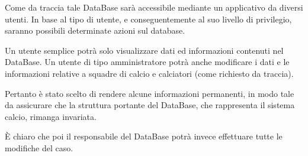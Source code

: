 \bigskip
\bigskip

Come da traccia tale DataBase sarà accessibile mediante un applicativo da diversi utenti.
In base al tipo di utente, e conseguentemente al suo livello di privilegio, saranno possibili
determinate azioni sul database.

Un utente semplice potrà solo visualizzare dati ed informazioni contenuti nel DataBase.
Un utente di tipo amministratore potrà anche modificare i dati e le informazioni relative a
squadre di calcio e calciatori (come richiesto da traccia).

Pertanto è stato scelto di rendere alcune informazioni permanenti, in modo tale da assicurare
che la struttura portante del DataBase, che rappresenta il sistema calcio, rimanga invariata.

È chiaro che poi il responsabile del DataBase potrà invece effettuare tutte le modifiche del caso.